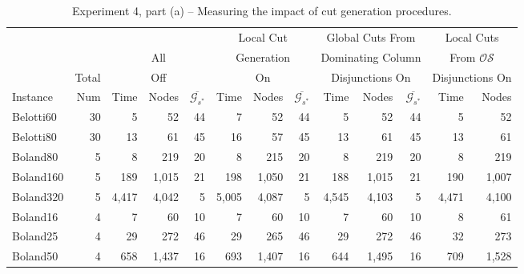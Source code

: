 \documentclass[11.5pt]{article}
\newcommand{\OS}{\mathcal{OS}}
\begin{document}
\begin{table}%
\small
\centering
\caption{Experiment 4, part (a) -- Measuring the impact of cut generation procedures.}\label{table_cuts1}
\begin{tabular}{l|r|rrr|rrr|rrr|rr}
\toprule
 &  & \multicolumn{3}{c}{} & \multicolumn{3}{c}{Local Cut} & \multicolumn{3}{c}{Global Cuts From} & \multicolumn{2}{c}{Local Cuts}\\ 
 &  & \multicolumn{3}{c}{All} & \multicolumn{3}{c}{Generation} & \multicolumn{3}{c}{Dominating Column} & \multicolumn{2}{c}{From $\OS$}\\ 
  & Total & \multicolumn{3}{c}{Off} & \multicolumn{3}{c}{On} & \multicolumn{3}{c}{Disjunctions On} & \multicolumn{2}{c}{Disjunctions On}\\
\cmidrule(r){3-5}
\cmidrule(r){6-8}
\cmidrule(r){9-11}
\cmidrule(r){12-13}
Instance & Num & Time & Nodes & $\overline{\mathcal{G}_{s^*}}$ & Time & Nodes & $\overline{\mathcal{G}_{s^*}}$ & Time & Nodes & $\overline{\mathcal{G}_{s^*}}$ & Time & Nodes  \\ 
\midrule
Belotti60 & 30 & 5 & 52 & 44 & 7  & 52 & 44 & 5 & 52 & 44 & 5 & 52 \\
Belotti80 & 30 & 13 & 61 & 45 & 16 & 57 & 45 & 13 & 61 & 45 & 13 & 61 \\
\midrule
Boland80 & 5 & 8 & 219 & 20 & 8 & 215 & 20 & 8 & 219 & 20 & 8 & 219 \\
Boland160 & 5 & 189 & 1,015 & 21 & 198 & 1,050 & 21 & 188 & 1,015 & 21 & 190 & 1,007 \\
Boland320 & 5 & 4,417 & 4,042 & 5 & 5,005 & 4,087 & 5 & 4,545 & 4,103 & 5 & 4,471 & 4,100 \\
Boland16 & 4 & 7 & 60 & 10 & 7 & 60 & 10 & 7 & 60 & 10 & 8 & 61 \\
Boland25 & 4 & 29 & 272 & 46 & 29 & 265 & 46 & 29 & 272 & 46 & 32 & 273 \\
Boland50 & 4 & 658 & 1,437 & 16 & 693 & 1,407 & 16 & 644 & 1,495 & 16 & 709 & 1,528   \\
\bottomrule
\end{tabular}
\end{table}
%
\end{document}
